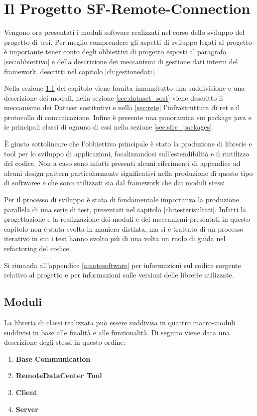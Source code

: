
\chapter{Il Progetto SF-Remote-Connection}
\label{ch:sfremoteconnection}

Vengono ora presentati i moduli software realizzati nel corso dello sviluppo del progetto di tesi.
Per meglio comprendere gli aspetti di sviluppo legati al progetto \`e importante tener conto degli obbiettivi di progetto esposti al paragrafo \ref{sec:obbiettivo} e della descrizione dei meccanismi di gestione dati interni del framework, descritti nel capitolo \ref{ch:gestionedati}.

Nella sezione \ref{sec:moduli} del capitolo viene fornita innanzitutto una suddivisione e una descrizione dei moduli, nella sezione \ref{sec:dataset_sost} viene descritto il meccanismo dei Dataset sostitutivi
e nella \ref{sec:rete} l'infrastruttura di ret e il protocollo di comunicazione.
Infine \`e presente una panoramica sui package java e le principali classi di ognuno di essi nella sezione \ref{sec:sfrc_packages}.

\`E giusto sottolineare che l'obbiettivo principale \`e stato la produzione di librerie e tool per lo sviluppo di applicazioni, focalizzandosi sull'estendibilit\`a e il riutilizzo del codice. Non a caso sono infatti presenti alcuni riferimenti di appendice ad alcuni design pattern particolarmente significativi nella produzione di questo tipo di softwaree e che sono utilizzati sia dal framework che dai moduli stessi.

Per il processo di sviluppo \`e stata di fondamentale importanza la produzione parallela di una serie di test, presentati nel capitolo \ref{ch:testerisultati}. Infatti la progettazione e la realizzazione dei moduli e dei meccanismi presentati in questo capitolo non \`e stata svolta in maniera distinta, ma si \`e trattato di un processo iterativo in cui i test hanno svolto pi\`u di una volta un ruolo di guida nel refactoring del codice.

Si rimanda all'appendice \ref{a:notesoftware} per informazioni sul codice sorgente relativo al progetto e per informazioni sulle versioni delle librerie utilizzate.

\section{Moduli} 
\label{sec:moduli}
La libreria di classi realizzata pu\`o essere suddivisa in quattro macro-moduli suddivisi in base alle finalit\`a e alle funzionalit\`a.
Di seguito viene data una descrizione degli stessi in questo ordine:
\begin{enumerate}
	\item \textbf{Base Communication}
	\item \textbf{RemoteDataCenter Tool}
	\item \textbf{Client}
	\item \textbf{Server}
\end{enumerate}

